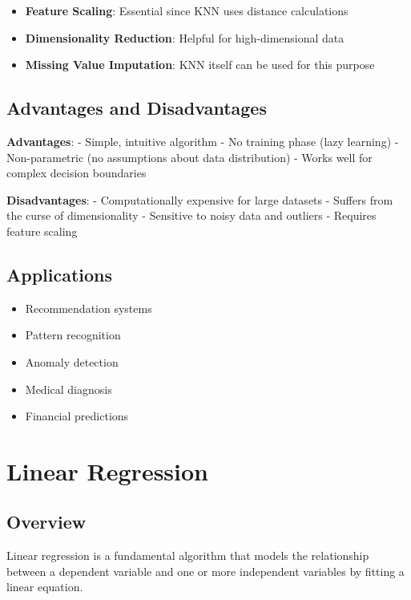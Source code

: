 \documentclass[
  letterpaper,
  DIV=11,
  numbers=noendperiod]{scrreprt}
\providecommand{\tightlist}{%
  \setlength{\itemsep}{0pt}\setlength{\parskip}{0pt}}\usepackage{longtable,booktabs,array}
\begin{document}
\begin{itemize}
\tightlist
\item
  \textbf{Feature Scaling}: Essential since KNN uses distance
  calculations
\item
  \textbf{Dimensionality Reduction}: Helpful for high-dimensional data
\item
  \textbf{Missing Value Imputation}: KNN itself can be used for this
  purpose
\end{itemize}

\subsection{Advantages and
Disadvantages}\label{advantages-and-disadvantages}

\textbf{Advantages}: - Simple, intuitive algorithm - No training phase
(lazy learning) - Non-parametric (no assumptions about data
distribution) - Works well for complex decision boundaries

\textbf{Disadvantages}: - Computationally expensive for large datasets -
Suffers from the curse of dimensionality - Sensitive to noisy data and
outliers - Requires feature scaling

\subsection{Applications}\label{applications-1}

\begin{itemize}
\tightlist
\item
  Recommendation systems
\item
  Pattern recognition
\item
  Anomaly detection
\item
  Medical diagnosis
\item
  Financial predictions
\end{itemize}

\section{Linear Regression}\label{linear-regression}

\subsection{Overview}\label{overview-1}

Linear regression is a fundamental algorithm that models the
relationship between a dependent variable and one or more independent
variables by fitting a linear equation.
\end{document}
